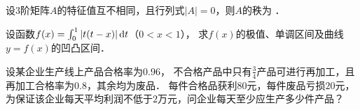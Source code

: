 \documentclass[plain,noanswer,medmath]{../../template/jnuexam}
\begin{document}


\begin{problem}
设$3$阶矩阵$A$的特征值互不相同，且行列式$|A| = 0$，则$A$的秩为 \fillin{}．
\end{problem}








\begin{problem}[points=10]
设函数$f(x) = \int_0^1 |t(t - x)|\mathop{}\!\mathrm{d} t$（$0 < x < 1$），
求$f(x)$的极值、单调区间及曲线$y = f(x)$的凹凸区间．
\end{problem}














\begin{problem}[points=11]
设某企业生产线上产品合格率为$0.96$，
不合格产品中只有$\frac{3}{4}$产品可进行再加工，且再加工合格率为$0.8$，其余均为废品．
每件合格品获利$80$元，每件废品亏损$20$元，
为保证该企业每天平均利润不低于$2$万元，问企业每天至少应生产多少件产品？
\end{problem}
\end{document}
